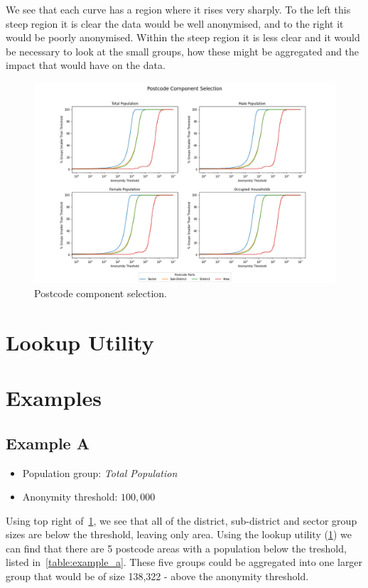 \documentclass[12pt, a4paper]{article}
\begin{document}
We see that each curve has a region where it rises very sharply. To the left this steep region it is clear the data would be well anonymised, and to the right it would be poorly anonymised. Within the steep region it is less clear and it would be necessary to look at the small groups, how these might be aggregated and the impact that would have on the data.

\begin{figure}
\includegraphics[width=1\textwidth,trim={3cm, 0cm, 3cm, 0cm},clip]{images/postcode_selection.png}
\caption{Postcode component selection.}\label{fig:postcode_selection}
\end{figure}

\section{Lookup Utility}\label{lookup-utlity}

\section{Examples}
\subsection{Example A}
\begin{itemize}
\item Population group: \textit{Total Population}
\item Anonymity threshold: $100,000$
\end{itemize}
Using top right of~\cref{fig:postcode_selection}, we see that all of the district, sub-district and sector group sizes are below the threshold, leaving only area. Using the lookup utility (\cref{lookup-utlity}) we can find that there are 5 postcode areas with a population below the treshold, listed in~\cref{table:example_a}. These five groups could be aggregated into one larger group that would be of size 138,322 - above the anonymity threshold.
\end{document}
